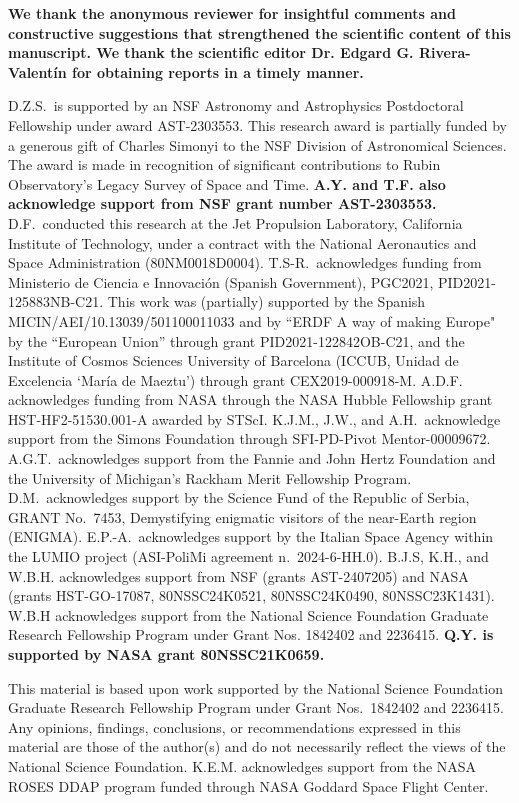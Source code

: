 \documentclass[linenumbers,twocolumn,longbib]{aastex7}
\begin{document}
\begin{acknowledgments}

\textbf{We thank the anonymous reviewer for insightful comments and constructive suggestions that strengthened the scientific content of this manuscript. We thank the scientific editor Dr. Edgard G. Rivera-Valent\'in for obtaining reports in a timely manner. }

D.Z.S.\ is supported by an NSF Astronomy and Astrophysics Postdoctoral Fellowship under award AST-2303553. This research award is partially funded by a generous gift of Charles Simonyi to the NSF Division of Astronomical Sciences. The award is made in recognition of significant contributions to Rubin Observatory's Legacy Survey of Space and Time. \textbf{A.Y. and T.F. also acknowledge support from NSF grant number AST-2303553.}
D.F.\ conducted this research at the Jet Propulsion Laboratory, California Institute of Technology, under a contract with the National Aeronautics and Space Administration (80NM0018D0004).
T.S-R.\ acknowledges funding from Ministerio de Ciencia e Innovaci{\'o}n (Spanish Government), PGC2021, PID2021-125883NB-C21. This work was (partially) supported by the Spanish MICIN/AEI/10.13039/501100011033 and by ``ERDF A way of making Europe" by the “European Union” through grant PID2021-122842OB-C21, and the Institute of Cosmos Sciences University of Barcelona (ICCUB, Unidad de Excelencia `Mar\'ia de Maeztu’) through grant CEX2019-000918-M. A.D.F. acknowledges funding from NASA through the NASA Hubble Fellowship grant HST-HF2-51530.001-A awarded by STScI. K.J.M., J.W., and A.H.\ acknowledge support from the Simons Foundation through SFI-PD-Pivot Mentor-00009672. A.G.T.\ acknowledges support from the Fannie and John Hertz Foundation and the University of Michigan's Rackham Merit Fellowship Program. D.M.\ acknowledges support by the Science Fund of the Republic of Serbia, GRANT No.\ 7453, Demystifying enigmatic visitors of the near-Earth region (ENIGMA). E.P.-A.\ acknowledges support by the Italian Space Agency within the LUMIO project (ASI-PoliMi agreement n.\ 2024-6-HH.0).  B.J.S, K.H., and W.B.H. acknowledges support from NSF (grants AST-2407205) and NASA (grants HST-GO-17087, 80NSSC24K0521, 80NSSC24K0490, 80NSSC23K1431).  W.B.H acknowledges support from the National Science Foundation Graduate Research Fellowship Program under Grant Nos. 1842402 and 2236415. \textbf{Q.Y. is supported by NASA grant 80NSSC21K0659.}

This material is based upon work supported by the National Science Foundation Graduate Research Fellowship Program under Grant Nos.\ 1842402 and 2236415. Any opinions, findings, conclusions, or recommendations expressed in this material are those of the author(s) and do not necessarily reflect the views of the National Science Foundation. K.E.M. acknowledges support from the NASA ROSES DDAP program funded through NASA Goddard Space Flight Center.


\end{acknowledgments}
\end{document}
